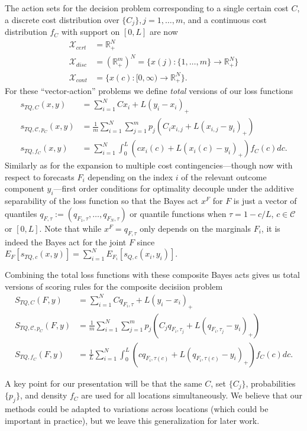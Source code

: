 \documentclass{article}
\begin{document}
The action sets for the decision problem corresponding to a single certain cost $C$, a discrete cost distribution over $\{C_j\}, j = 1,\ldots,m$, and a continuous cost distribution $f_C$ with support on $[0,L]$ are now
\begin{align}
\mathcal{X}_{cert} &= \mathbb{R}_{+}^N \\
\mathcal{X}_{disc} &= (\mathbb{R}_{+}^m)^N = \{x(j):\{1,\ldots,m\} \to \mathbb{R}_{+}^N\}\\
\mathcal{X}_{cont} &= \{x(c):[0,\infty) \to \mathbb{R}_{+}^N\}.
\end{align}
For these ``vector-action'' problems we define \emph{total} versions of our loss functions
\begin{align}
s_{TQ, C}(x,y) &= \sum_{i=1}^N Cx_i + L(y_i-x_i)_+ \label{eqn:TQ_loss} \\
s_{TQ, \mathcal{C}, p_C}(x,y) &= \frac{1}{m}\sum_{i=1}^N \sum_{j=1}^{m}p_j(C_i x_{i,j} + L(x_{i,j} - y_i)_+)\\
s_{TQ, f_C}(x,y) &= \sum_{i=1}^N \int_{0}^{L} (cx_i(c) + L(x_i(c) - y_i)_+) f_C(c)dc.
\end{align}
Similarly as for the expansion to multiple cost contingencies---though now with respect to forecasts $F_i$ depending on the 
index $i$ of the relevant outcome component $y_i$---first order conditions for optimality decouple under the additive separability of the loss function so that the Bayes act $x^F$ for $F$ is just a vector of quantiles $q_{F,\tau} := (q_{F_1,\tau},\ldots,q_{F_N,\tau})$ or quantile functions when $\tau = 1 - c/L$, $c \in \mathcal{C}$ or $[0,L]$. Note that while $x^F=q_{F,\tau}$ only depends on the marginals 
$F_i$, it is indeed the Bayes act for the joint $F$ since $E_F[s_{TQ,c}(x, y)] = \sum_{i=1}^{N}E_{F_i}[s_{Q,c}(x_i, y_i)]$.

Combining the total loss functions with these composite Bayes acts gives us total versions of scoring rules for the composite decisiion problem
\begin{align}
S_{TQ,C}(F,y) &= \sum_{i=1}^{N}Cq_{F_i,\tau} + L(y_i-x_i)_+ \\
S_{TQ,\mathcal{C}, p_C}(F,y) &= \frac{1}{m}\sum_{i=1}^{N}\sum_{j=1}^{m}p_j(C_j q_{F_i,\tau_j} + L(q_{F_i,\tau_j} - y_i)_+) \\
S_{TQ, f_C}(F,y) &= \frac{1}{L}\sum_{i=1}^{N}\int_{0}^{L}(cq_{F_i,\tau(c)} + L(q_{F_i,\tau(c)} - y_i)_+) f_C(c)dc.
\end{align}

A key point for our presentation will be that the same $C$, set $\{C_j\}$, probabilities $\{p_j\}$, and density $f_C$ are used for all locations simultaneously.  We believe that our methods could be adapted to variations across locations (which could be important in practice), but we leave this generalization for later work. 
\end{document}
